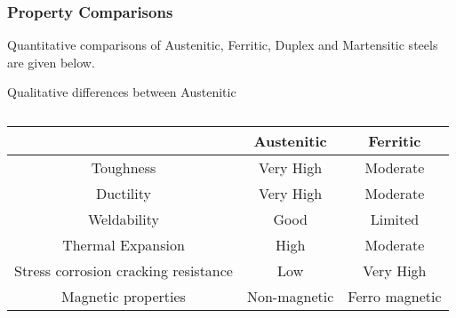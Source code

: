 \subsubsection{Property Comparisons}

Quantitative comparisons of Austenitic, Ferritic, Duplex and Martensitic steels are given below.





Qualitative differences between Austenitic


\begin{table}[h]
\begin{center}
\begin{tabular}{c c c}
\hline
      & Austenitic & Ferritic \\
\hline
Toughness                               & Very High    & Moderate \\
Ductility                               & Very High    & Moderate \\
Weldability                             & Good         & Limited \\
Thermal Expansion                       & High         & Moderate \\
Stress corrosion cracking resistance    & Low          & Very High \\
Magnetic properties                     & Non-magnetic & Ferro magnetic \\
\end{tabular}
\end{center}
\caption{\cite{ferriticvsaustenitic}}
\end{table}

